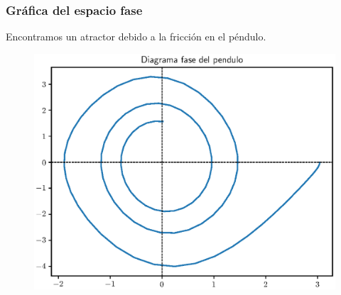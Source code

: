 \documentclass[12pt]{beamer}
\begin{document}
\begin{frame}[plain]
\frametitle{Gráfica del espacio fase}
Encontramos un atractor debido a la fricción en el péndulo.
\begin{figure}
    \centering
    \includegraphics[scale=0.5]{Imagenes/plot_Ejercicio_odeint_02_Pendulo.eps}
\end{figure}
\end{frame}
\end{document}
